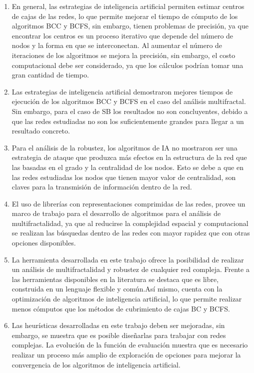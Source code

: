 \begin{enumerate}
    \item En general, las estrategias de inteligencia artificial permiten estimar centros de cajas de las redes, lo que permite mejorar el tiempo de cómputo de los algoritmos BCC y BCFS, sin embargo, tienen problemas de precisión, ya que encontrar los centros es un proceso iterativo que depende del número de nodos y la forma en que se interconectan. Al aumentar el número de iteraciones de los algoritmos se mejora la precisión, sin embargo, el costo computacional debe ser considerado, ya que los cálculos podrían tomar una gran cantidad de tiempo.
    \item Las estrategias de inteligencia artificial demostraron mejores tiempos de ejecución de los algoritmos BCC y BCFS en el caso del análisis multifractal. Sin embargo, para el caso de SB los resultados no son concluyentes, debido a que las redes estudiadas no son los suficientemente grandes para llegar a un resultado concreto.
    \item Para el análisis de la robustez, los algoritmos de IA no mostraron ser una estrategia de ataque que produzca más efectos en la estructura de la red que las basadas en el grado y la centralidad de los nodos. Esto se debe a que en las redes estudiadas los nodos que tienen mayor valor de centralidad, son claves para la transmisión de información dentro de la red.
    \item El uso de librerías con representaciones comprimidas de las redes, provee un marco de trabajo para el desarrollo de algoritmos para el análisis de multifractalidad, ya que al reducirse la complejidad espacial y computacional se realizan las búsquedas dentro de las redes con mayor rapidez que con otras opciones disponibles.
    \item La herramienta desarrollada en este trabajo ofrece la posibilidad de realizar un análisis de multifractalidad y robustez de cualquier red compleja. Frente a las herramientas disponibles en la literatura se destaca que es libre, construida en un lenguaje flexible y común.Así mismo, cuenta con la optimización de algoritmos de inteligencia artificial, lo que permite realizar menos cómputos que los métodos de cubrimiento de cajas BC y BCFS.
    \item Las heurísticas desarrolladas en este trabajo deben ser mejoradas, sin embargo, se muestra que es posible diseñarlas para trabajar con redes complejas. La evolución de la función de evaluación muestra que es necesario realizar un proceso más amplio de exploración de opciones para mejorar la convergencia de los algoritmos de inteligencia artificial.
\end{enumerate}
